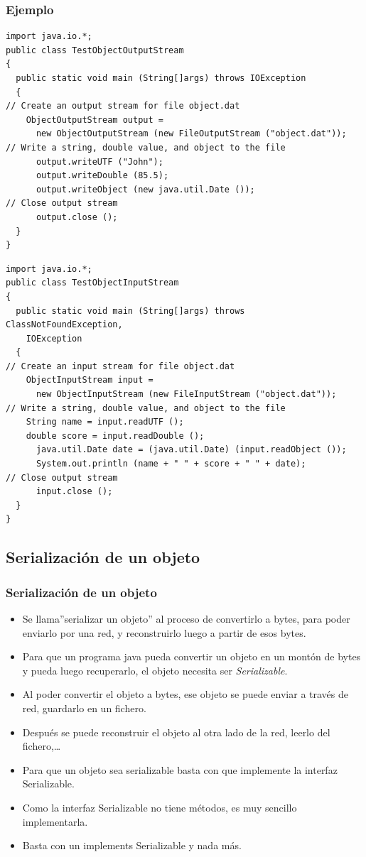 \documentclass{beamer}
\begin{document}
\begin{frame}[fragile]
\frametitle{Ejemplo}
\begin{tiny}
\begin{verbatim}
import java.io.*;
public class TestObjectOutputStream
{
  public static void main (String[]args) throws IOException
  {
// Create an output stream for file object.dat
    ObjectOutputStream output =
      new ObjectOutputStream (new FileOutputStream ("object.dat"));
// Write a string, double value, and object to the file
      output.writeUTF ("John");
      output.writeDouble (85.5);
      output.writeObject (new java.util.Date ());
// Close output stream
      output.close ();
  }
}
\end{verbatim}
\begin{verbatim}
import java.io.*;
public class TestObjectInputStream
{
  public static void main (String[]args) throws ClassNotFoundException,
    IOException
  {
// Create an input stream for file object.dat
    ObjectInputStream input =
      new ObjectInputStream (new FileInputStream ("object.dat"));
// Write a string, double value, and object to the file
    String name = input.readUTF ();
    double score = input.readDouble ();
      java.util.Date date = (java.util.Date) (input.readObject ());
      System.out.println (name + " " + score + " " + date);
// Close output stream
      input.close ();
  }
}
\end{verbatim}
\end{tiny}
\end{frame}

\subsection{Serialización de un objeto}

\begin{frame}[fragile]
\frametitle{Serialización de un objeto}
\begin{itemize}[<+->]
\item Se llama''serializar un objeto'' al proceso de convertirlo a bytes, para poder enviarlo por una red, y reconstruirlo luego a partir de esos bytes.
\item Para que un programa java pueda convertir un objeto en un montón de bytes y pueda luego recuperarlo, el objeto necesita ser \emph{Serializable}. 
\item Al poder convertir el objeto a bytes, ese objeto se puede enviar a través de red, guardarlo en un fichero.
\item Después se puede reconstruir el objeto al otra lado de la red, leerlo del fichero,\dots
\item Para que un objeto sea serializable basta con que implemente la interfaz Serializable.
\item Como la interfaz Serializable no tiene métodos, es muy sencillo implementarla.
\item Basta con un \alert{implements Serializable} y nada más.
\end{itemize}
\end{frame}
\end{document}
